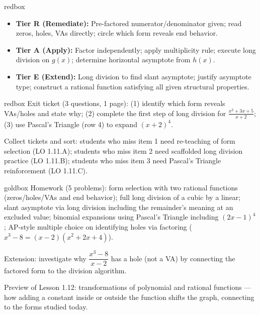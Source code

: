 \documentclass[10pt]{article}
\begin{document}
\begin{skillbox}{redbox}
\begin{itemize}[leftmargin=1.2em,itemsep=2pt,topsep=0pt]
  \item \textbf{Tier R (Remediate):} Pre-factored numerator/denominator given; read zeros, holes,
        VAs directly; circle which form reveals end behavior.
  \item \textbf{Tier A (Apply):} Factor independently; apply multiplicity rule; execute long
        division on $g(x)$; determine horizontal asymptote from $h(x)$.
  \item \textbf{Tier E (Extend):} Long division to find slant asymptote; justify asymptote type;
        construct a rational function satisfying all given structural properties.
\end{itemize}
\end{skillbox}

\begin{skillbox}{redbox}
Exit ticket (3 questions, 1 page): (1) identify which form reveals VAs/holes and state why;
(2) complete the first step of long division for $\frac{x^2+3x+5}{x+2}$;
(3) use Pascal's Triangle (row 4) to expand $(x+2)^4$.

Collect tickets and sort: students who miss item 1 need re-teaching of form selection (LO 1.11.A);
students who miss item 2 need scaffolded long division practice (LO 1.11.B);
students who miss item 3 need Pascal's Triangle reinforcement (LO 1.11.C).
\end{skillbox}

\begin{skillbox}{goldbox}
Homework (5 problems): form selection with two rational functions (zeros/holes/VAs and end
behavior); full long division of a cubic by a linear; slant asymptote via long division
including the remainder's meaning at an excluded value; binomial expansions using Pascal's
Triangle including $(2x-1)^4$; AP-style multiple choice on identifying holes via factoring
($x^3-8 = (x-2)(x^2+2x+4)$).

Extension: investigate why $\dfrac{x^3-8}{x-2}$ has a hole (not a VA) by connecting the
factored form to the division algorithm.

Preview of Lesson 1.12: transformations of polynomial and rational functions --- how adding a
constant inside or outside the function shifts the graph, connecting to the forms studied today.
\end{skillbox}
\end{document}
